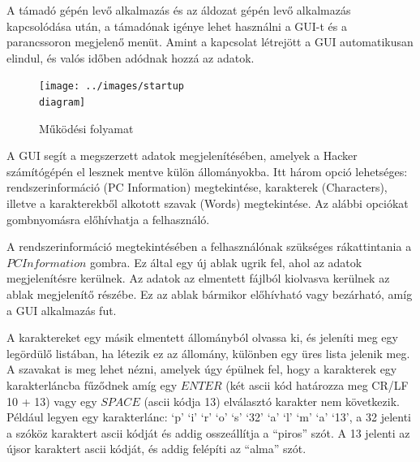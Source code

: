 \documentclass[12pt,a4paper,oneside]{report}
\begin{document}
A támadó gépén levő alkalmazás és az áldozat gépén levő alkalmazás kapcsolódása után, a támadónak igénye lehet használni a GUI-t és a parancssoron megjelenő menüt. Amint a kapcsolat létrejött a GUI automatikusan elindul, és valós időben adódnak hozzá az adatok.
\begin{figure}[H]
\centering
\texttt{[image: ../images/startup\\ diagram]}
\caption{Működési folyamat}
\label{fig:startupdia}
\end{figure}

A GUI segít a megszerzett adatok megjelenítésében, amelyek a Hacker számítógépén el lesznek mentve külön állományokba. Itt három opció lehetséges: rendszerinformáció (PC Information) megtekintése, karakterek (Characters), illetve a karakterekből alkotott szavak (Words) megtekintése. Az alábbi opciókat gombnyomásra előhívhatja a felhasználó.

A rendszerinformáció megtekintésében a felhasználónak szükséges rákattintania a $PC Information$ gombra. Ez által egy új ablak ugrik fel, ahol az adatok megjelenítésre kerülnek. Az adatok az elmentett fájlból kiolvasva kerülnek az ablak megjelenítő részébe. Ez az ablak bármikor előhívható vagy bezárható, amíg a GUI alkalmazás fut.

A karaktereket egy másik elmentett állományból olvassa ki, és jeleníti meg egy legördülő listában, ha létezik ez az állomány, különben egy üres lista jelenik meg. A szavakat is meg lehet nézni, amelyek úgy épülnek fel, hogy a karakterek egy karakterláncba fűződnek amíg egy $ENTER$ (két ascii kód határozza meg CR/LF 10 + 13) vagy egy $SPACE$ (ascii kódja 13) elválasztó karakter nem következik. Például legyen egy karakterlánc: `p' `i' `r' `o' `s' `32' `a' `l' `m' `a' `13', a 32 jelenti a szóköz karaktert ascii kódját és addig osszeállítja a ``piros'' szót. A 13 jelenti az újsor karaktert ascii kódját, és addig felépíti az ``alma'' szót.
\end{document}
